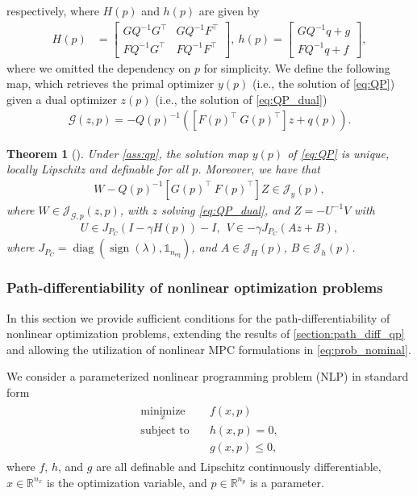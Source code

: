 \documentclass[journal,twoside,web,final]{ieeecolor}
\newtheorem{theorem}{Theorem}
\theoremstyle{definition}
\newcommand{\R}{\mathbb{R}}
\newcommand{\J}{\mathcal{J}}
\begin{document}
respectively, where $H(p)$ and $h(p)$ are given by
\begin{align*}
H(p) & = \begin{bmatrix}
G Q^{-1} G^\top & G Q^{-1} F^\top\\
F Q ^{-1} G^\top & F Q ^{-1} F^\top
\end{bmatrix},~
h(p) = \begin{bmatrix}
GQ^{-1}q+g\\
FQ^{-1}q+f
\end{bmatrix},
\end{align*}
where we omitted the dependency on $p$ for simplicity. We define the following map, which retrieves the primal optimizer $y(p)$ (i.e., the solution of \cref{eq:QP}) given a dual optimizer $z(p)$ (i.e., the solution of \cref{eq:QP_dual})
\begin{align*}
\mathcal{G}(z,p) = -Q(p)^{-1} ( [F(p)^\top~G(p)^\top] z + q(p) ).
\end{align*}
%
\begin{theorem}[{\hspace{1sp}\cite[Theorem 1]{zuliani2023bp}}]
Under \cref{ass:qp}, the solution map $y(p)$ of \cref{eq:QP} is unique, locally Lipschitz and definable for all $p$. Moreover, we have that
\begin{align*}
W-Q(p)^{-1}[G(p)^\top~F(p)^\top]Z \in \J_y(p),
\end{align*}
where $W \in \J_{\mathcal{G},p}(z,p)$, with $z$ solving \cref{eq:QP_dual}, and $Z=-U^{-1}V$ with
\begin{align*}
U \in J_{P_C}(I-\gamma H(p))-I,~~V \in -\gamma J_{P_C}(Az+B),
\end{align*}
where $J_{P_C} = \operatorname*{diag}(\operatorname*{sign}(\lambda),\mathds{1}_{n_\text{eq}})$, and $A \in \J_H(p)$, $B \in \J_h(p)$.
\end{theorem}

\subsubsection{Path-differentiability of nonlinear optimization problems} \label{section:path_diff_nlp}

In this section we provide sufficient conditions for the path-differentiability of nonlinear optimization problems, extending the results of \cref{section:path_diff_qp} and allowing the utilization of nonlinear MPC formulations in \cref{eq:prob_nominal}.

We consider a parameterized nonlinear programming problem (NLP) in standard form
\begin{align}
\begin{split}
\operatorname*{minimize}_x & \quad f(x,p)\\
\text{subject to} & \quad h(x,p) = 0,\\
& \quad g(x,p) \leq 0,
\end{split}\label{eq:NLP}
\end{align}
where $f$, $h$, and $g$ are all definable and Lipschitz continuously differentiable, $x\in\R^{n_x}$ is the optimization variable, and $p\in\R^{n_p}$ is a parameter.
\end{document}
